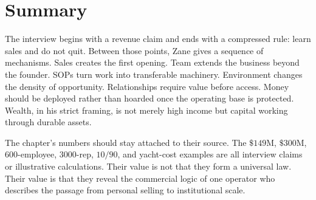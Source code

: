 \section{Summary}

The interview begins with a revenue claim and ends with a compressed rule: learn sales and do not quit. Between those points, Zane gives a sequence of mechanisms. Sales creates the first opening. Team extends the business beyond the founder. SOPs turn work into transferable machinery. Environment changes the density of opportunity. Relationships require value before access. Money should be deployed rather than hoarded once the operating base is protected. Wealth, in his strict framing, is not merely high income but capital working through durable assets.

The chapter's numbers should stay attached to their source. The \(\$149\mathrm{M}\), \(\$300\mathrm{M}\), \(600\)-employee, \(3000\)-rep, \(10/90\), and yacht-cost examples are all interview claims or illustrative calculations. Their value is not that they form a universal law. Their value is that they reveal the commercial logic of one operator who describes the passage from personal selling to institutional scale.